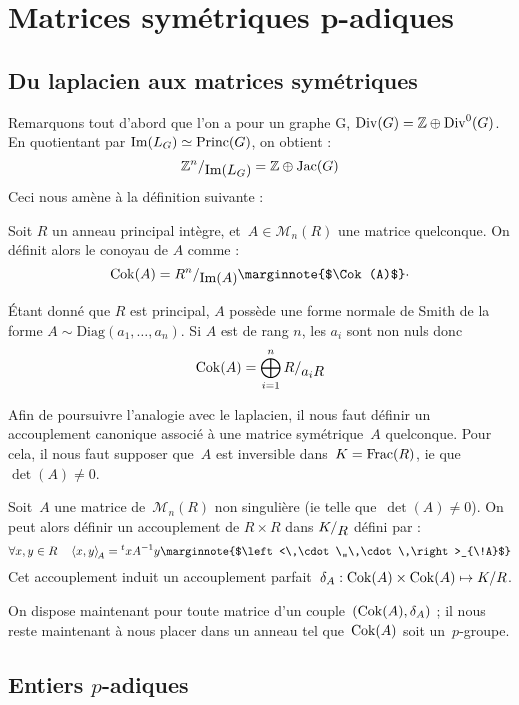 \section{Matrices symétriques p-adiques}
\subsection{Du laplacien aux matrices symétriques}

Remarquons tout d'abord que l'on a pour un graphe G, $\operatorname{Div}(G) = \mathbb{Z} \oplus \operatorname{Div}^0(G)$. En quotientant par $\operatorname{Im}(L_G) \simeq \operatorname{Princ}(G)$, on obtient : 
\[ 
	\quotient{\mathbb{Z}^n}{\Im(L_G)} = \mathbb{Z} \oplus \Jac(G) 
\]
Ceci nous amène à la définition suivante : 
\begin{defi}
Soit $R$ un anneau principal intègre, et~$A\in\mathcal{M}_n(R)$ une matrice quelconque.
On définit alors le conoyau de $A$ comme : 
\[\Cok(A) = \quotient{R^n}{\Im(A)} \text{\marginnote{$\Cok(A)$}}\cdot\]
\end{defi}

\begin{rem}
\'Etant donné que $R$ est principal, $A$ possède une forme normale de Smith de la forme $A \sim \text{Diag}(a_1,\dots,a_n)$. Si $A$ est de rang $n$, les $a_i$ sont non nuls donc 
\[\Cok(A) = \bigoplus_{i=1}^n{\quotient{R}{a_iR}}\]
\end{rem}

Afin de poursuivre l'analogie avec le laplacien, il nous faut définir un accouplement canonique associé à une matrice symétrique~$A$ quelconque. Pour cela, il nous faut supposer que~$A$ est inversible dans~$K = \operatorname{Frac}(R)$, ie que~$\det(A)\neq0$.
\begin{defi}
Soit~$A$ une matrice de~$\mathcal{M}_n(R)$ non singulière (ie telle que~$\det(A)\neq 0$).
On peut alors définir un accouplement de $R\times R$ dans $\quotient{K}{R}$ défini par :
\[ \forall x,y\in R\quad \left<x,y\right>_{\!A} = {}^txA^{-1}y \text{\marginnote{$\left<\,\cdot\,,\,\cdot\,\right>_{\!A}$}}\]
Cet accouplement induit un accouplement parfait~$\delta_A : \operatorname{Cok}(A)\times\operatorname{Cok}(A) \mapsto K/R$.
\end{defi}

On dispose maintenant pour toute matrice d'un couple~$(\operatorname{Cok}(A), \delta_A)$ ; il nous reste maintenant à nous placer dans un anneau tel que~$\operatorname{Cok}(A)$ soit un~$p$-groupe.

\subsection{Entiers $p$-adiques}

